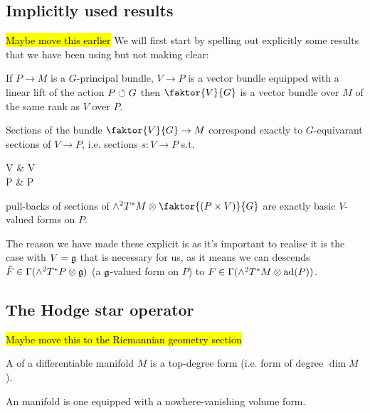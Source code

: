 \documentclass{article}
\begin{document}
\subsection{Implicitly used results}

\hl{Maybe move this earlier}
We will first start by spelling out explicitly some results that we have been using but not making clear:

\begin{lemma}
	If $P \to M$ is a $G$-principal bundle, $V \to P$ is a vector bundle equipped with a linear lift of the action $P \circlearrowleft G$ then $\faktor{V}{G}$ is a vector bundle over $M$ of the same rank as $V$ over $P$. 
\end{lemma}

\begin{lemma}
	Sections of the bundle $\faktor{V}{G} \to M$ correspond exactly to $G$-equivarant sections of $V \to P$, i.e. sections $s:V\to P$ s.t. 
	\begin{tkz}
	V \arrow[r,"g"] \arrow[d] & V \arrow[d] \\ P \arrow[r,"g"'] \arrow[u,bend left=20,"s"] & P \arrow[u,bend right=20, "s"']
	\end{tkz} 
\end{lemma}

\begin{lemma}
	pull-backs of sections of $\wedge^2 T^\ast M \otimes \faktor{(P \times V)}{G}$ are exactly basic $V$-valued forms on $P$. 
\end{lemma}

The reason we have made these explicit is as it's important to realise it is the case with $V= \mathfrak{g}$ that is necessary for us, as it means we can descends $\tilde{F} \in \Gamma(\wedge^2 T^\ast P \otimes \mathfrak{g})$ (a $\mathfrak{g}$-valued form on $P$) to $F\in \Gamma(\wedge^2 T^\ast M \otimes \operatorname{ad}(P))$. 

\subsection{The Hodge star operator}
\hl{Maybe move this to the Riemannian geometry section}

\begin{definition}
	A  of a differentiable manifold $M$ is a top-degree form (i.e. form of degree $\dim M$). 
\end{definition}

\begin{definition}
	An  manifold is one equipped with a nowhere-vanishing volume form. 
\end{definition}
\end{document}
